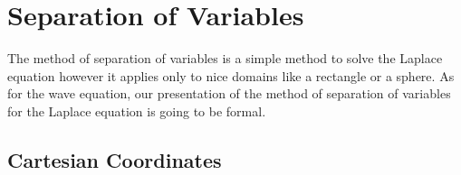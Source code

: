 

\section{Separation of Variables} \label{SectLaplaceSepVar}

The method of separation of variables is a simple method to solve the
Laplace equation however it applies only to nice domains like a
rectangle or a sphere.  As for the wave equation, our presentation of
the method of separation of variables for the Laplace equation is going
to be formal.

\subsection{Cartesian Coordinates}

